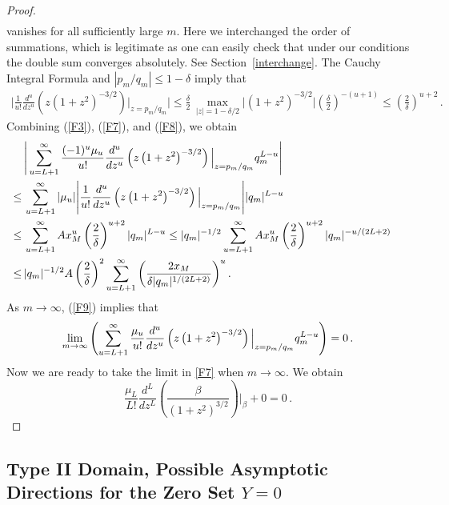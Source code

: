 \documentclass{article}
\theoremstyle{remark}
\numberwithin{equation}{section}
\begin{document}
\begin{proof}
\begin{equation}
\begin{split}
\end{split}
\end{equation}
vanishes for all sufficiently large $m$. Here we interchanged the order of summations, which is legitimate as one can easily check that under
our conditions the double sum converges absolutely. See Section~\ref{interchange}.
The Cauchy Integral Formula and $|p_m/q_m| \leq 1-\delta$ imply that
\begin{equation} \label{F8}
\begin{split}
\Bigg| \frac{1}{u!} \frac{d^u}{dz^u} \left( z\left( 1 + z^2 \right)^{-3/2} \right) \Big|_{z = p_m/q_m} \Bigg|
\leq \frac{\delta}{2} \, \max_{|z| = 1 - \delta/2} {\Bigg| \left( 1 + z^2 \right)^{-3/2} \Bigg|} \left( \frac{\delta}{2} \right)^{-(u+1)} \leq \left( \frac{2}{\delta} \right)^{u+2}\,.
\end{split}
\end{equation}
Combining (\ref{F3}), (\ref{F7}), and (\ref{F8}), we obtain
\begin{equation} \label{F9}
\begin{split}
& \, \Bigg| \sum_{u=L+1}^\infty{\frac{(-1)^u \mu_u}{u!} \frac{d^u}{dz^u} \left( z\left( 1 + z^2 \right)^{-3/2} \right) \Big|_{z = p_m/q_m}} q_m^{L-u} \Bigg| \cr
\leq & \, \sum_{u=L+1}^\infty{ |\mu_u| \Bigg| \frac{1}{u!} \frac{d^u}{dz^u} \left(z \left( 1 + z^2 \right)^{-3/2} \right) \Big|_{z = p_m/q_m} \Bigg| |q_m|^{L-u}} \cr
\leq & \, \sum_{u=L+1}^\infty{A x_M^u \left( \frac{2}{\delta} \right)^{u+2}  |q_m|^{L-u}}
\leq |q_m|^{-1/2} \sum_{u=L+1}^\infty{A x_M^u \left( \frac{2}{\delta} \right)^{u+2} |q_m|^{-u/(2L+2)}} \cr
\leq & \, |q_m|^{-1/2} A\left( \frac{2}{\delta} \right)^2 \sum_{u=L+1}^\infty{\left( \frac{2x_M}{\delta|q_m|^{1/(2L+2)}} \right)^u}\,. \cr
\end{split}
\end{equation}
As $m \rightarrow \infty$, (\ref{F9}) implies that
\begin{equation} \notag
\lim_{m \rightarrow \infty}{ \left( \sum_{u=L+1}^\infty{\frac{\mu_u}{u!} \frac{d^u}{dz^u} \left( z\left( 1 + z^2 \right)^{-3/2} \right) \Big|_{z = p_m/q_m}}q_m^{L-u} \right)} = 0\,.
\end{equation}
Now we are ready to take the limit in \ref{F7} when $m \rightarrow \infty$. We obtain
$$\frac{\mu_L}{L!} \frac{d^L}{d z^L} \left( \frac{\beta}{(1+z^2)^{3/2}} \right) \bigg |_\beta + 0 = 0\,.$$
\end{proof}                                                                                                                                                                                                                                                                                                                                                                                                             \subsection{Type II Domain, Possible Asymptotic Directions for the Zero Set $Y=0$}\label{SecYTypeII}
\end{document}
